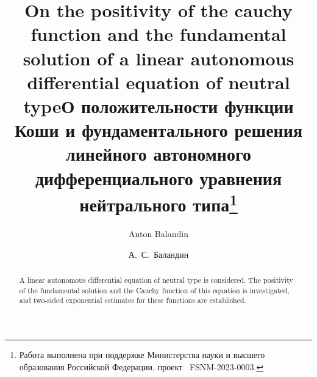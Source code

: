 

\begin{englishtitle} %
\title{On the positivity of the cauchy function and the fundamental solution of a linear autonomous differential equation of neutral type}
\author{Anton Balandin
}

\maketitle

\begin{abstract}
A linear autonomous differential equation of neutral type is considered. The positivity of the fundamental solution and the Cauchy function of this equation is investigated, and two-sided exponential estimates for these functions are established.

\end{abstract}
\end{englishtitle}


\iffalse
\documentclass[12pt]{llncs}


\usepackage{iftex}

\ifPDFTeX
\usepackage[T2A]{fontenc}
\usepackage[utf8]{inputenc} %
\usepackage[english,russian]{babel}
\fi

\usepackage{todonotes}

\usepackage[russian]{nla}




\fi
%

\title{О положительности функции Коши и фундаментального решения линейного автономного дифференциального уравнения нейтрального типа\thanks{Работа выполнена при поддержке Министерства науки и высшего образования Российской Федерации, проект \textnumero~FSNM-2023-0003.}}
\author{А.~С.~Баландин %
} %

